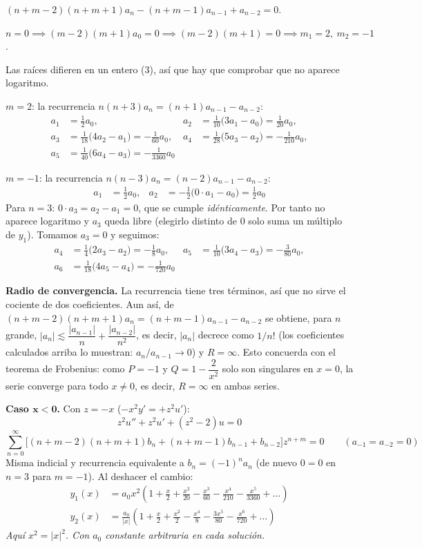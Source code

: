 \documentclass[11pt, a4paper]{article}
\begin{document}
\smallskip\noindent $(n+m-2)(n+m+1)a_n-(n+m-1)a_{n-1}+a_{n-2}=0$.

\smallskip\noindent $n=0 \implies (m-2)(m+1)a_0=0 \implies (m-2)(m+1)=0 \implies m_1=2,\ m_2=-1$.

\smallskip\noindent Las raíces difieren en un entero ($3$), así que hay que comprobar que no aparece logaritmo.

\smallskip\noindent $m=2$: la recurrencia $n(n+3)a_n=(n+1)a_{n-1}-a_{n-2}$:
\begin{align*}
a_1&=\tfrac12a_0, & a_2&=\tfrac1{10}\Big(3a_1-a_0\Big)=\tfrac1{20}a_0, \\
a_3&=\tfrac1{18}\Big(4a_2-a_1\Big)=-\tfrac1{60}a_0, & a_4&=\tfrac1{28}\Big(5a_3-a_2\Big)=-\tfrac1{210}a_0, \\
a_5&=\tfrac1{40}\Big(6a_4-a_3\Big)=-\tfrac1{3360}a_0
\end{align*}

\smallskip\noindent $m=-1$: la recurrencia $n(n-3)a_n=(n-2)a_{n-1}-a_{n-2}$:
\begin{align*}
a_1&=\tfrac12a_0, & a_2&=-\tfrac12\Big(0\cdot a_1-a_0\Big)=\tfrac12a_0
\end{align*}
Para $n=3$: $0\cdot a_3=a_2-a_1=0$, que se cumple \emph{idénticamente}. Por tanto no aparece logaritmo y $a_3$ queda libre (elegirlo distinto de $0$ solo suma un múltiplo de $y_1$). Tomamos $a_3=0$ y seguimos:
\begin{align*}
a_4&=\tfrac14\Big(2a_3-a_2\Big)=-\tfrac18a_0, & a_5&=\tfrac1{10}\Big(3a_4-a_3\Big)=-\tfrac3{80}a_0, \\ a_6&=\tfrac1{18}\Big(4a_5-a_4\Big)=-\tfrac1{720}a_0
\end{align*}

\smallskip\noindent\textbf{Radio de convergencia.} La recurrencia tiene tres términos, así que no sirve el cociente de dos coeficientes. Aun así, de $(n+m-2)(n+m+1)a_n=(n+m-1)a_{n-1}-a_{n-2}$ se obtiene, para $n$ grande, $|a_n|\lesssim\dfrac{|a_{n-1}|}{n}+\dfrac{|a_{n-2}|}{n^2}$, es decir, $|a_n|$ decrece como $1/n!$ (los coeficientes calculados arriba lo muestran: $a_n/a_{n-1}\to0$) y $R=\infty$. Esto concuerda con el teorema de Frobenius: como $P=-1$ y $Q=1-\dfrac{2}{x^2}$ solo son singulares en $x=0$, la serie converge para todo $x\neq0$, es decir, $R=\infty$ en ambas series.

\vspace{0.2cm}\noindent\textbf{Caso $\bm{x<0}$.} Con $z=-x$ ($-x^2y'=+z^2u'$):
\[
z^2u''+z^2u'+(z^2-2)u=0
\]
\[
\sum_{n=0}^\infty\Big[(n+m-2)(n+m+1)b_n+(n+m-1)b_{n-1}+b_{n-2}\Big]z^{n+m}=0 \qquad (a_{-1}=a_{-2}=0)
\]
Misma indicial y recurrencia equivalente a $b_n=(-1)^na_n$ (de nuevo $0=0$ en $n=3$ para $m=-1$). Al deshacer el cambio:
\[
\boxed{\begin{aligned}y_1(x)&=a_0x^2\left(1+\frac{x}{2}+\frac{x^2}{20}-\frac{x^3}{60}-\frac{x^4}{210}-\frac{x^5}{3360}+\dots\right) \\[2pt] y_2(x)&=\frac{a_0}{|x|}\left(1+\frac{x}{2}+\frac{x^2}{2}-\frac{x^4}{8}-\frac{3x^5}{80}-\frac{x^6}{720}+\dots\right)\end{aligned}}
\]
\textit{Aquí $x^2=|x|^2$. Con $a_0$ constante arbitraria en cada solución.}
\end{document}
